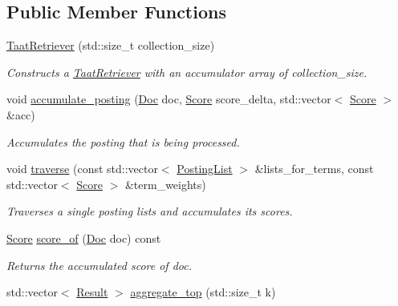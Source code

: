 \subsection*{Public Member Functions}
\begin{DoxyCompactItemize}
\item 
\mbox{\hyperlink{classbloodhound_1_1query_1_1TaatRetriever_af443da08f4200fb84a3481d47bc4ac35}{Taat\+Retriever}} (std\+::size\+\_\+t collection\+\_\+size)
\begin{DoxyCompactList}\small\item\em Constructs a \mbox{\hyperlink{classbloodhound_1_1query_1_1TaatRetriever}{Taat\+Retriever}} with an accumulator array of collection\+\_\+size. \end{DoxyCompactList}\item 
void \mbox{\hyperlink{classbloodhound_1_1query_1_1TaatRetriever_a34def8d627b446d7459792ab9c50dcab}{accumulate\+\_\+posting}} (\mbox{\hyperlink{structbloodhound_1_1Doc}{Doc}} doc, \mbox{\hyperlink{structbloodhound_1_1Score}{Score}} score\+\_\+delta, std\+::vector$<$ \mbox{\hyperlink{structbloodhound_1_1Score}{Score}} $>$ \&acc)
\begin{DoxyCompactList}\small\item\em Accumulates the posting that is being processed. \end{DoxyCompactList}\item 
void \mbox{\hyperlink{classbloodhound_1_1query_1_1TaatRetriever_a1b476e4ada85862cb79a92b6424d2aa2}{traverse}} (const std\+::vector$<$ \mbox{\hyperlink{classbloodhound_1_1PostingList}{Posting\+List}} $>$ \&lists\+\_\+for\+\_\+terms, const std\+::vector$<$ \mbox{\hyperlink{structbloodhound_1_1Score}{Score}} $>$ \&term\+\_\+weights)
\begin{DoxyCompactList}\small\item\em Traverses a single posting lists and accumulates its scores. \end{DoxyCompactList}\item 
\mbox{\hyperlink{structbloodhound_1_1Score}{Score}} \mbox{\hyperlink{classbloodhound_1_1query_1_1TaatRetriever_ae1c8d9643ca85ba7dba32325538e30b5}{score\+\_\+of}} (\mbox{\hyperlink{structbloodhound_1_1Doc}{Doc}} doc) const
\begin{DoxyCompactList}\small\item\em Returns the accumulated score of doc. \end{DoxyCompactList}\item 
std\+::vector$<$ \mbox{\hyperlink{structbloodhound_1_1query_1_1Result}{Result}} $>$ \mbox{\hyperlink{classbloodhound_1_1query_1_1TaatRetriever_a7f631f87075249c768873d15a59956c5}{aggregate\+\_\+top}} (std\+::size\+\_\+t k)

\end{DoxyCompactItemize}
